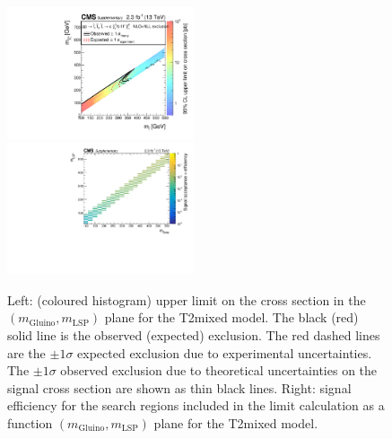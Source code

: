\clearpage
\begin{figure}[t]
  \begin{center}
    \includegraphics[width=0.49\textwidth]{supplementary/figures/RA1T2mixedXSEC} \, 
    \includegraphics[width=0.49\textwidth]{supplementary/figures/T2mixed_merging_4_cats} \,     
  \end{center}
  \caption{Left: (coloured histogram) upper limit on the cross section in the $(m_{\mathrm{Gluino}},m_{\mathrm{LSP}})$ plane for the T2mixed model. 
  The black (red) solid line is the observed (expected) exclusion. The red dashed lines are the $\pm1\sigma$ expected exclusion due to experimental uncertainties. 
  The $\pm1\sigma$ observed exclusion due to theoretical uncertainties on the signal cross section are shown as thin black lines. 
  Right: signal efficiency for the search regions included in the limit calculation as a function $(m_{\mathrm{Gluino}},m_{\mathrm{LSP}})$ plane for the T2mixed model. 
  \label{fig:T2mixed_excl}}
\end{figure}

